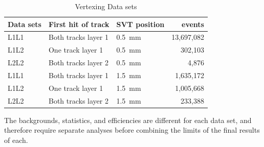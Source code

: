 \begin{table}[htb]
\caption{Vertexing Data sets}
\label{tab:datasets}
\centering
\begin{tabular}{lllr}
\toprule
Data sets &First hit of track & SVT position & events \\
\midrule
L1L1 & Both tracks layer 1 & 0.5~mm & 13,697,082\\
L1L2 & One track layer 1 & 0.5~mm & 302,103\\
L2L2 & Both tracks layer 2 & 0.5~mm & 4,876\\
L1L1 & Both tracks layer 1 & 1.5~mm & 1,635,172\\
L1L2 & One track layer 1 & 1.5~mm & 1,005,668\\
L2L2 & Both tracks layer 2 & 1.5~mm & 233,388\\
\bottomrule
\end{tabular}
\end{table}
The backgrounds, statistics, and efficiencies are different for each data set, and therefore require separate analyses before combining the limits of the final results of each.

